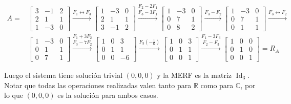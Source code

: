 \documentclass[12pt,reqno]{amsart}
\begin{document}
\begin{enumerate}
\begin{enumerate}
\begin{align*}
A = &\begin{bmatrix}3 & -1 & 2 \\2 & 1 & 1 \\1&-3&0\end{bmatrix}
\stackrel{F_1 \leftrightarrow F_3}{\longrightarrow}
\begin{bmatrix}1&-3&0\\2 & 1 & 1 \\3 & -1 & 2 \end{bmatrix}
\stackrel{F_2 - 2 F_1}{\stackrel{F_3 - 3 F_1}{\longrightarrow}}
\begin{bmatrix} 1 & -3 & 0 \\ 0 & 7 & 1 \\ 0 & 8 & 2 \end{bmatrix}
\stackrel{F_3-F_2}{\longrightarrow}
\begin{bmatrix} 1 & -3 & 0 \\ 0 & 7 & 1 \\ 0 & 1 & 1 \end{bmatrix}
\stackrel{F_3 \leftrightarrow F_2}{\longrightarrow} \\
&\begin{bmatrix} 1 & -3 & 0 \\ 0 & 1 & 1 \\ 0 & 7 & 1 \end{bmatrix}
\stackrel{F_1 + 3 F_2}{\stackrel{F_3-7F_2}{\longrightarrow}}
\begin{bmatrix} 1 & 0 & 3 \\ 0 & 1 & 1 \\ 0 & 0 & -6 \end{bmatrix}
\stackrel{F_3 (-\frac{1}{6}) }{\longrightarrow}
\begin{bmatrix} 1 & 0 & 3 \\ 0 & 1 & 1 \\ 0 & 0 & 1 \end{bmatrix}
\stackrel{F_1 - 3 F_3}{\stackrel{F_2 - F_3 }{\longrightarrow}}
\begin{bmatrix} 1 & 0 & 0 \\ 0 & 1 & 0 \\ 0 & 0 & 1 \end{bmatrix} = R_A
\end{align*}

Luego el sistema tiene solución trivial $(0,0,0)$ y la MERF es la matriz $\operatorname{Id}_3$. Notar que todas las operaciones realizadas valen tanto para $\mathbb{R}$ como para $\mathbb{C}$, por lo que $(0,0,0)$ es la solución para ambos casos.


\end{enumerate}
\end{enumerate}
\end{document}
